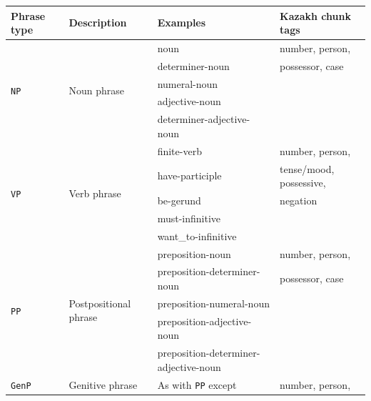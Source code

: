 \documentclass[11pt]{article}
\begin{document}
\begin{savenotes}
\begin{table}
  \centering
  \begin{tabular}{|l|l|l|l|}
    \hline
    \textbf{Phrase type} & \textbf{Description} & \textbf{Examples} & \textbf{Kazakh chunk tags} \\
    \hline
    \multirow{5}{*}{\texttt{NP}} & \multirow{5}{*}{Noun phrase}    & noun & number, person, \\
                                 &                                 & determiner-noun & possessor, case\\
                                 &                                 & numeral-noun & \\
                                 &                                 & adjective-noun & \\
                                 &                                 & determiner-adjective-noun & \\
    \hline
    \multirow{5}{*}{\texttt{VP}} & \multirow{5}{*}{Verb phrase}    & finite-verb & number, person, \\
                                 &                                 & have-participle & tense/mood, possessive, \\
                                 &                                 & be-gerund & negation \\
                                 &                                 & must-infinitive & \\ 
                                 &                                 & want\_to-infinitive & \\ 
    \hline
    \multirow{5}{*}{\texttt{PP}} & \multirow{5}{*}{Postpositional phrase} & preposition-noun & number, person, \\
                                 &                                        & preposition-determiner-noun & possessor, case \\
                                 &                                        & preposition-numeral-noun & \\
                                 &                                        & preposition-adjective-noun & \\
                                 &                                        & preposition-determiner-adjective-noun & \\
    \hline
    \multirow{2}{*}{\texttt{GenP}} & \multirow{2}{*}{Genitive phrase}  & As with \texttt{PP} except & number, person, \\

\end{tabular}
\end{table}
\end{savenotes}
\end{document}
